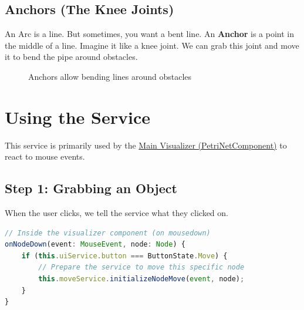 \documentclass[a4paper,11pt,oneside]{report}
\begin{document}
\subsection{Anchors (The Knee Joints)}

An Arc is a line. But sometimes, you want a bent line.
An \textbf{Anchor} is a point in the middle of a line. Imagine it like a knee joint. We can grab this joint and move it to bend the pipe around obstacles.

\begin{figure}[H]
\centering
{}
\caption{Anchors allow bending lines around obstacles}
\label{fig:anchors}
\end{figure}

\section{Using the Service}

This service is primarily used by the \hyperref[chap:visualizer]{Main Visualizer (PetriNetComponent)} to react to mouse events.

\subsection{Step 1: Grabbing an Object}

When the user clicks, we tell the service what they clicked on.

\begin{lstlisting}[language=TypeScript]
// Inside the visualizer component (on mousedown)
onNodeDown(event: MouseEvent, node: Node) {
    if (this.uiService.button === ButtonState.Move) {
        // Prepare the service to move this specific node
        this.moveService.initializeNodeMove(event, node);
    }
}
\end{lstlisting}
\end{document}
